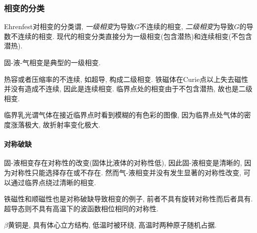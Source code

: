 \documentclass[../Thermal.tex]{subfiles}
\begin{document}
\subsubsection{相变的分类}
Ehrenfest对相变的分类谓, \emph{一级相变}为导致$G$不连续的相变, \emph{二级相变}为导致$G$的导数不连续的相变. 现代的相变分类直接分为一级相变(包含潜热)和连续相变(不包含潜热).
\begin{ex}
固-液-气相变是典型的一级相变.
\end{ex}
\begin{ex}
热容或者压缩率的不连续, 如超导, 构成二级相变. 铁磁体在Curie点以上失去磁性并没有造成不连续, 因此是连续相变. 临界点处的相变由于不包含潜热, 故也是二级相变.
\end{ex}
\begin{ex}
临界乳光谓气体在接近临界点时看到模糊的有色彩的图像, 因为临界点处气体的密度涨落极大, 故折射率变化极大.
\end{ex}
\paragraph{对称破缺} 固-液相变存在对称性的改变(固体比液体的对称性低), 因此固-液相变是清晰的, 因为对称性只能选择存在或不存在. 然而气-液相变并没有发生显著的对称性改变, 可以通过临界点绕过清晰的相变.
\begin{ex}
铁磁性和顺磁性也是对称破缺导致相变的例子, 前者不具有旋转对称性而后者具有. 超导态则不具有高温下的波函数相位相同的对称性.
\end{ex}
\begin{ex}
$\beta$黄铜是, 具有体心立方结构, 低温时被环绕, 高温时两种原子随机占据. 
\end{ex}
\end{document}
